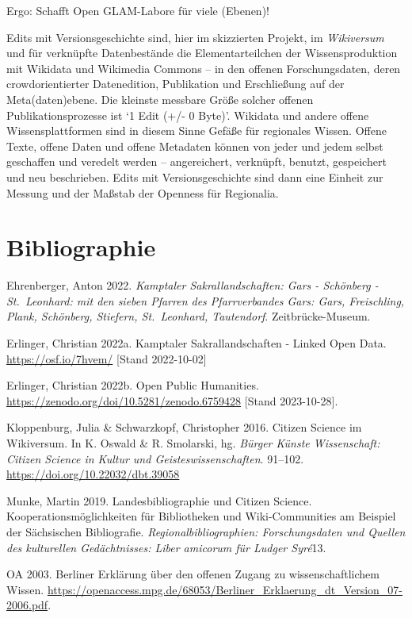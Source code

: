 \documentclass[a4paper,
fontsize=11pt,
oneside,
numbers=noperiodatend,
parskip=half-,
bibliography=totoc,
final
]{scrartcl}
\begin{document}
Ergo: Schafft Open GLAM-Labore für viele (Ebenen)!

Edits mit Versionsgeschichte sind, hier im skizzierten Projekt, im
\emph{Wikiversum} und für verknüpfte Datenbestände die Elementarteilchen
der Wissensproduktion mit Wikidata und Wikimedia Commons -- in den
offenen Forschungsdaten, deren crowdorientierter Datenedition,
Publikation und Erschließung auf der Meta(daten)ebene. Die kleinste
messbare Größe solcher offenen Publikationsprozesse ist \enquote*{1 Edit
(+/- 0 Byte)}. Wikidata und andere offene Wissensplattformen sind in
diesem Sinne Gefäße für regionales Wissen. Offene Texte, offene Daten
und offene Metadaten können von jeder und jedem selbst geschaffen und
veredelt werden -- angereichert, verknüpft, benutzt, gespeichert und neu
beschrieben. Edits mit Versionsgeschichte sind dann eine Einheit zur
Messung und der Maßstab der Openness für Regionalia.

\hypertarget{bibliographie}{%
\section{Bibliographie}\label{bibliographie}}

Ehrenberger, Anton 2022. \emph{Kamptaler Sakrallandschaften: Gars -
Schönberg - St.~Leonhard: mit den sieben Pfarren des Pfarrverbandes
Gars: Gars, Freischling, Plank, Schönberg, Stiefern, St.~Leonhard,
Tautendorf}. Zeitbrücke-Museum.

Erlinger, Christian 2022a. Kamptaler Sakrallandschaften - Linked Open
Data. \url{https://osf.io/7hvem/} {[}Stand 2022-10-02{]}

Erlinger, Christian 2022b. Open Public Humanities.
\url{https://zenodo.org/doi/10.5281/zenodo.6759428} {[}Stand
2023-10-28{]}.

Kloppenburg, Julia \& Schwarzkopf, Christopher 2016. Citizen Science im
Wikiversum. In K. Oswald \& R. Smolarski, hg. \emph{Bürger Künste
Wissenschaft: Citizen Science in Kultur und Geisteswissenschaften}.
91--102. \url{https://doi.org/10.22032/dbt.39058}

Munke, Martin 2019. Landesbibliographie und Citizen Science.
Kooperationsmöglichkeiten für Bibliotheken und Wiki-Communities am
Beispiel der Sächsischen Bibliograﬁe. \emph{Regionalbibliographien:
Forschungsdaten und Quellen des kulturellen Gedächtnisses: Liber
amicorum für Ludger Syré}13.

OA 2003. Berliner Erklärung über den offenen Zugang zu
wissenschaftlichem Wissen.
\url{https://openaccess.mpg.de/68053/Berliner_Erklaerung_dt_Version_07-2006.pdf}.
\end{document}
